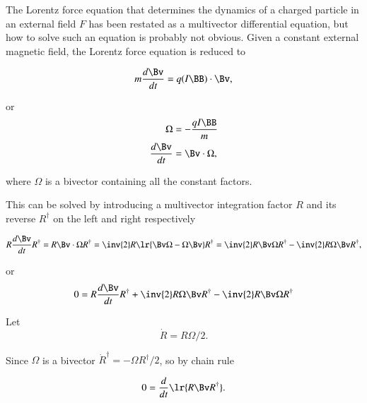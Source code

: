 %
%

The Lorentz force equation that determines the dynamics of a charged particle in an external field \( F \) has been restated as a multivector differential equation, but how to solve such an equation is probably not obvious.
Given a constant external magnetic field, the Lorentz force equation is reduced to

\begin{dmath}\label{eqn:lorentzForce_constantMagnetic:60}
m \frac{d\Bv}{dt} = q (I \BB) \cdot \Bv,
\end{dmath}

or
\begin{dmath}\label{eqn:lorentzForce_constantMagnetic:80}
\begin{aligned}
\Omega &= -\frac{q I \BB}{m} \\
\frac{d\Bv}{dt} &= \Bv \cdot \Omega,
\end{aligned}
\end{dmath}

where \( \Omega \) is a bivector containing all the constant factors.

This can be solved by introducing a multivector integration factor \( R \) and its reverse \( R^\dagger \) on the left and right respectively

\begin{dmath}\label{eqn:lorentzForce_constantMagnetic:100}
R \frac{d\Bv}{dt} R^\dagger
= R \Bv \cdot \Omega R^\dagger
= \inv{2} R \lr{ \Bv \Omega - \Omega \Bv} R^\dagger
= \inv{2} R \Bv \Omega R^\dagger - \inv{2} R \Omega \Bv R^\dagger,
\end{dmath}

or
\begin{dmath}\label{eqn:lorentzForce_constantMagnetic:120}
0 =
R \frac{d\Bv}{dt} R^\dagger
+ \inv{2} R \Omega \Bv R^\dagger
- \inv{2} R \Bv \Omega R^\dagger
\end{dmath}

Let
\begin{dmath}\label{eqn:lorentzForce_constantMagnetic:140}
\dot{R} = R \Omega/2.
\end{dmath}

Since \( \Omega \) is a bivector \( \dot{R}^\dagger = -\Omega R^\dagger/2 \), so by chain rule

\begin{dmath}\label{eqn:lorentzForce_constantMagnetic:160}
0
=
\frac{d}{dt} \lr{
R \Bv R^\dagger
}.
\end{dmath}


